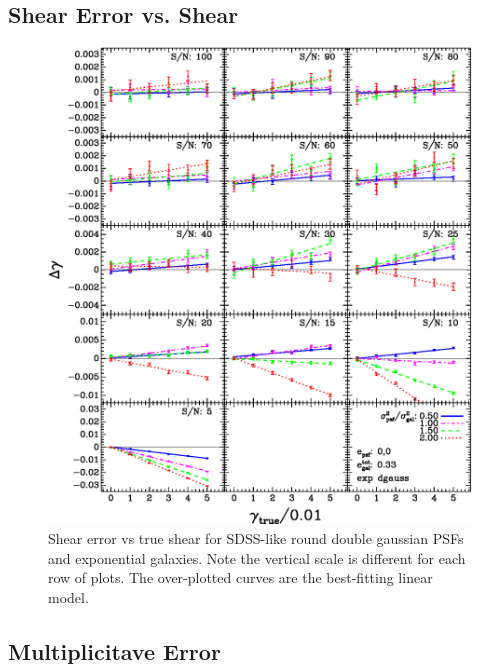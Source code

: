 \documentclass[12pt,preprint]{aastex}
\newcommand{\psf}{PSF}
\begin{document}
\subsection{Shear Error vs. Shear}

\begin{figure}[p] \centering
 \centering 
 \includegraphics[scale=1.1]{figures/set-s2n-edg02-vs-shear.eps}

 \caption{Shear error vs true shear for SDSS-like round double gaussian \psf s
 and exponential galaxies.  Note the vertical scale is different for each row
 of plots.  The over-plotted curves are the best-fitting linear model.}
 \label{fig:edgdiffvsshroundpsf}

\end{figure}

\subsection{Multiplicitave Error}
\end{document}
